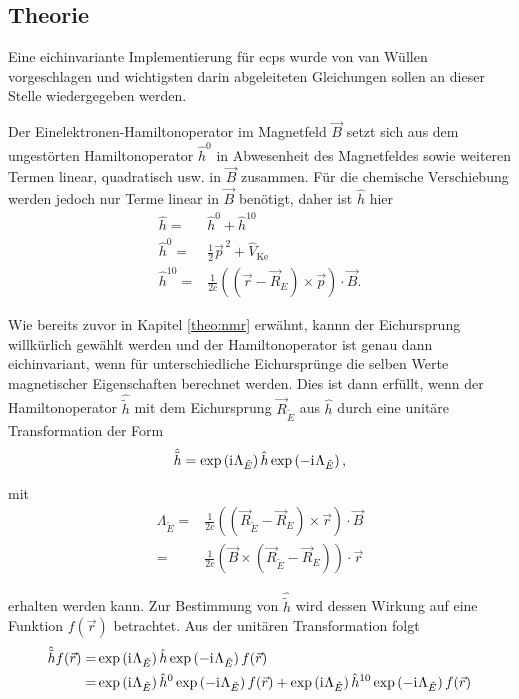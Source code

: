 	\subsection{Theorie}
	Eine eichinvariante Implementierung für \acp{ecp} wurde von van Wüllen\supercite{van2012use} vorgeschlagen und wichtigsten darin abgeleiteten Gleichungen sollen an dieser Stelle wiedergegeben werden. 
	
	Der Einelektronen-Hamiltonoperator im Magnetfeld $\vec{B}$ setzt sich aus dem ungestörten Hamiltonoperator $\hat{h}^0$ in Abwesenheit des Magnetfeldes sowie weiteren Termen linear, quadratisch usw. in $\vec{B}$ zusammen. Für die chemische Verschiebung werden jedoch nur Terme linear in $\vec{B}$ benötigt, daher ist $\hat{h}$ hier
	\begin{equation}\label{eq:heinel}
	\begin{aligned}
	\hat{h}=&\hat{h}^0+\hat{h}^{10}\\
	\hat{h}^0=&\frac{1}{2}\vec{p}^{\,2}+\hat{V}_{\textrm{Ke}}\\
	\hat{h}^{10}=&\frac{1}{2c}\left(\left(\vec{r}-\vec{R}_E\right)\times\vec{p}\right)\cdot\vec{B}.
	\end{aligned}
	\end{equation}
	
	Wie bereits zuvor in Kapitel \ref{theo:nmr} erwähnt, kannn der Eichursprung willkürlich gewählt werden und der Hamiltonoperator ist genau dann eichinvariant, wenn für unterschiedliche Eichursprünge die selben Werte magnetischer Eigenschaften berechnet werden. Dies ist dann erfüllt, wenn der Hamiltonoperator $\hat{\tilde{h}}$ mit dem Eichursprung $\vec{R}_{\tilde{E}}$ aus $\hat{h}$ durch eine unitäre Transformation der Form
	\begin{equation}\label{eq:trans}
	\hat{\tilde{h}}=\exp\left(\mathrm{i}\mkern1mu\Lambda_{\tilde{E}}\right)\hat{h}\exp\left(-\mathrm{i}\mkern1mu\Lambda_{\tilde{E}}\right),
	\end{equation}
	
	mit 
	\begin{equation}
	\begin{aligned}
	\Lambda_{\tilde{E}}=&\frac{1}{2c}\left(\left(\vec{R}_{\tilde{E}}-\vec{R}_E\right)\times\vec{r}\right)\cdot\vec{B}\\
	=&\frac{1}{2c}\left(\vec{B}\times\left(\vec{R}_{\tilde{E}}-\vec{R}_E\right)\right)\cdot\vec{r}
	\end{aligned}
	\end{equation}
	
	erhalten werden kann. Zur Bestimmung von $\hat{\tilde{h}}$ wird dessen Wirkung auf eine Funktion $f(\vec{r})$ betrachtet. Aus der unitären Transformation folgt
	\begin{equation}\label{eq:transh}
	\begin{aligned}
	\hat{\tilde{h}}f(\vec{r})=&\exp\left(\mathrm{i}\mkern1mu\Lambda_{\tilde{E}}\right)\hat{h}\exp\left(-\mathrm{i}\mkern1mu\Lambda_{\tilde{E}}\right)f(\vec{r})\\
	=&\exp\left(\mathrm{i}\mkern1mu\Lambda_{\tilde{E}}\right)\hat{h}^0\exp\left(-\mathrm{i}\mkern1mu\Lambda_{\tilde{E}}\right)f(\vec{r})+\exp\left(\mathrm{i}\mkern1mu\Lambda_{\tilde{E}}\right)\hat{h}^{10}\exp\left(-\mathrm{i}\mkern1mu\Lambda_{\tilde{E}}\right)f(\vec{r})
	\end{aligned}
	\end{equation}
	
